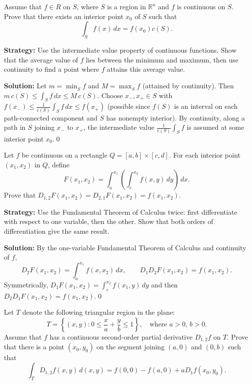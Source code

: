 \begin{problembox}
\begin{problemstatement}
Assume that \( f \in R \) on \( S \), where \( S \) is a region in \( \mathbb{R}^n \) and \( f \) is continuous on \( S \). Prove that there exists an interior point \( x_0 \) of \( S \) such that
\[\int_S f(x) \, dx = f(x_0)c(S).\]
\end{problemstatement}
\end{problembox}

\noindent\textbf{Strategy:} Use the intermediate value property of continuous functions. Show that the average value of $f$ lies between the minimum and maximum, then use continuity to find a point where $f$ attains this average value.

\bigskip\noindent\textbf{Solution:}
Let $m=\min_{\overline S} f$ and $M=\max_{\overline S} f$ (attained by continuity). Then $m\,c(S)\le \int_S f\,dx\le M\,c(S)$. Choose $x_-,x_+\in S$ with $f(x_-)\le \frac{1}{c(S)}\int_S f\,dx\le f(x_+)$ (possible since $f(S)$ is an interval on each path-connected component and $S$ has nonempty interior). By continuity, along a path in $S$ joining $x_-$ to $x_+$, the intermediate value $\frac{1}{c(S)}\int_S f$ is assumed at some interior point $x_0$.\qed


\begin{problembox}
\begin{problemstatement}
Let \( f \) be continuous on a rectangle \( Q = [a, b] \times [c, d] \). For each interior point \( (x_1, x_2) \) in \( Q \), define
\[F(x_1, x_2) = \int_a^{x_1} \left( \int_c^{x_2} f(x, y) \, dy \right) \, dx.\]
Prove that \( D_{1,2} F(x_1, x_2) = D_{2,1} F(x_1, x_2) = f(x_1, x_2) \).
\end{problemstatement}
\end{problembox}

\noindent\textbf{Strategy:} Use the Fundamental Theorem of Calculus twice: first differentiate with respect to one variable, then the other. Show that both orders of differentiation give the same result.

\bigskip\noindent\textbf{Solution:}
By the one-variable Fundamental Theorem of Calculus and continuity of $f$,
\[ D_2 F(x_1,x_2) = \int_a^{x_1} f(x,x_2)\,dx, \qquad D_1 D_2 F(x_1,x_2) = f(x_1,x_2). \]
Symmetrically, $D_1 F(x_1,x_2)=\int_c^{x_2} f(x_1,y)\,dy$ and then $D_2 D_1 F(x_1,x_2)=f(x_1,x_2)$.\qed


\begin{problembox}
\begin{problemstatement}
Let \( T \) denote the following triangular region in the plane:
\[T = \left\{ (x, y) : 0 \leq \frac{x}{a} + \frac{y}{b} \leq 1 \right\}, \quad \text{where } a > 0, \, b > 0.\]
Assume that \( f \) has a continuous second-order partial derivative \( D_{1,2} f \) on \( T \). Prove that there is a point \( (x_0, y_0) \) on the segment joining \( (a, 0) \) and \( (0, b) \) such that
\[\int_T D_{1,2} f(x, y) \, d(x, y) = f(0, 0) - f(a, 0) + aD_1 f(x_0, y_0).\]
\end{problemstatement}
\end{problembox}

